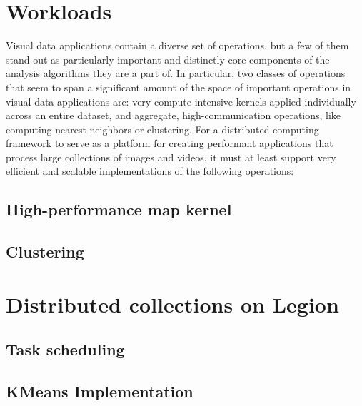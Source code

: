 \documentclass[tog]{acmsiggraph}
\begin{document}
\section{Workloads}
Visual data applications contain a diverse set of operations, but a few of them
stand out as particularly important and distinctly core components of the
analysis algorithms they are a part of. In particular, two classes
of operations that seem to span a significant amount of the space of important
operations in visual data applications are: very compute-intensive kernels
applied individually across an entire dataset, and aggregate,
high-communication operations, like computing nearest neighbors or
clustering. For a distributed computing framework to serve as a platform for
creating performant applications that process large collections of images and
videos, it must at least support very efficient and scalable implementations of
the following operations:

\subsection{High-performance map kernel}

\subsection{Clustering}


\section{Distributed collections on Legion}

\subsection{}

\subsection{Task scheduling}

\subsection{KMeans Implementation}
\end{document}
